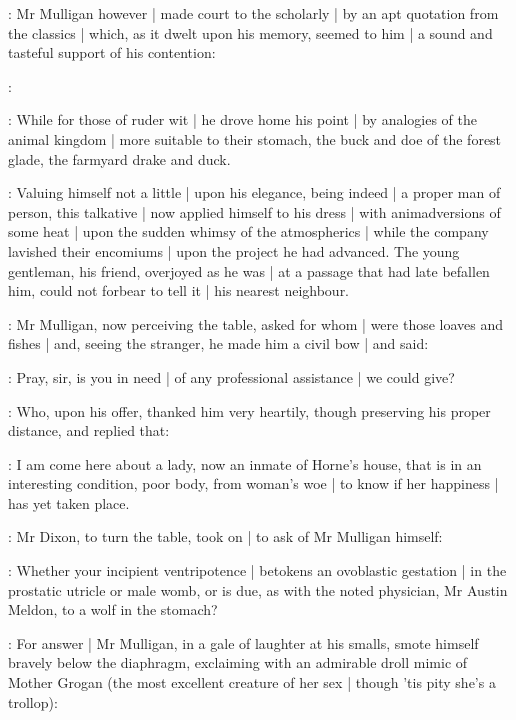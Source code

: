 :
Mr Mulligan however |
made court to the scholarly |
by an apt quotation from the classics |
which,
as it dwelt upon his memory,
seemed to him |
a sound and tasteful support of his contention:

\mulligan:

:
While for those of ruder wit |
he drove home his point |
by analogies of the animal kingdom |
more suitable to their stomach,
the buck and doe of the forest glade,
the farmyard drake and duck.


:
Valuing himself not a little |
upon his elegance,
being indeed |
a proper man of person,
this talkative |
now applied himself to his dress |
with animadversions of some heat |
upon the sudden whimsy of the atmospherics |
while the company lavished their encomiums |
upon the project he had advanced.
The young gentleman,
his friend,
overjoyed as he was |
at a passage that had late befallen him,
could not forbear to tell it |
his nearest neighbour.

:
Mr Mulligan,
now perceiving the table,
asked for whom |
were those loaves and fishes |
and,%
seeing the stranger,
he made him a civil bow |
and said:

\mulligan:
 Pray,
sir,
is you in need |
of any professional assistance |
we could give?

:
Who,
upon his offer,
thanked him very heartily,
though preserving his proper distance,
and replied that:

\Bloom:
I am come here about a lady,
now an inmate of Horne's house,
that is in an interesting condition,
poor body,
from woman's woe  |
to know if her happiness |
has yet taken place.

:
Mr Dixon,
to turn the table,
took on |
to ask of Mr Mulligan himself:

\dixon:
Whether your incipient ventripotence |
betokens an ovoblastic gestation |
in the prostatic utricle or male womb,
or is due,
as with the noted physician,
Mr Austin Meldon,
to a wolf in the stomach?%

:
For answer |
Mr Mulligan,
in a gale of laughter at his smalls,
smote himself bravely below the diaphragm,
exclaiming with an admirable droll mimic of Mother Grogan
(the most excellent creature of her sex |
though 'tis pity she's a trollop):

